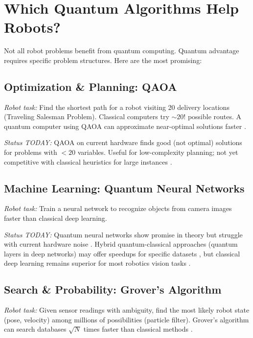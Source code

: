\documentclass[journal]{IEEEtran}
\begin{document}
\section{Which Quantum Algorithms Help Robots?}

Not all robot problems benefit from quantum computing. Quantum advantage requires specific problem structures. Here are the most promising:

\subsection{Optimization \& Planning: QAOA}

\textit{Robot task:} Find the shortest path for a robot visiting 20 delivery locations (Traveling Salesman Problem). Classical computers try $\sim20!$ possible routes. A quantum computer using QAOA can approximate near-optimal solutions faster \cite{b15, b16}.

\textit{Status TODAY:} QAOA on current hardware finds good (not optimal) solutions for problems with $<20$ variables. Useful for low-complexity planning; not yet competitive with classical heuristics for large instances \cite{b17, b18, b3}.

\subsection{Machine Learning: Quantum Neural Networks}

\textit{Robot task:} Train a neural network to recognize objects from camera images faster than classical deep learning.

\textit{Status TODAY:} Quantum neural networks show promise in theory but struggle with current hardware noise \cite{b19, b20, b21}. Hybrid quantum-classical approaches (quantum layers in deep networks) may offer speedups for specific datasets \cite{b22, b23, b24}, but classical deep learning remains superior for most robotics vision tasks \cite{b25, b26, b27}.

\subsection{Search \& Probability: Grover's Algorithm}

\textit{Robot task:} Given sensor readings with ambiguity, find the most likely robot state (pose, velocity) among millions of possibilities (particle filter). Grover's algorithm can search databases $\sqrt{N}$ times faster than classical methods \cite{b28, b29}.
\end{document}
